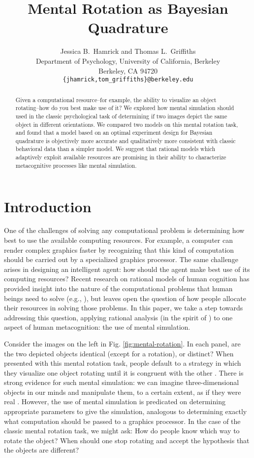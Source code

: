 \documentclass{article} %
\title{Mental Rotation as Bayesian Quadrature}
\author{Jessica B.~Hamrick and Thomas L.~Griffiths\\
  Department of Psychology, University of California, Berkeley\\
  Berkeley, CA 94720\\
  \texttt{\{jhamrick,tom\_griffiths\}@berkeley.edu}}
\begin{document}
\maketitle

\begin{abstract}
  Given a computational resource--for example, the ability to
  visualize an object rotating--how do you best make use of it? We
  explored how mental simulation should used in the classic
  psychological task of determining if two images depict the same
  object in different orientations. We compared two models on this
  mental rotation task, and found that a model based on an optimal
  experiment design for Bayesian quadrature is objectively more
  accurate and qualitatively more consistent with classic behavioral
  data than a simpler model. We suggest that rational models which
  adaptively exploit available resources are promising in their
  ability to characterize metacognitive processes like mental
  simulation.
\end{abstract}

\section{Introduction}

One of the challenges of solving any computational problem is
determining how best to use the available computing resources. For
example, a computer can render complex graphics faster by recognizing
that this kind of computation should be carried out by a specialized
graphics processor. The same challenge arises in designing an
intelligent agent: how should the agent make best use of its computing
resources? Recent research on rational models of human cognition has
provided insight into the nature of the computational problems that
human beings need to solve (e.g., \cite{Chater:1999wp,tenenbaumkgg11}),
but leaves open the question of how people allocate their resources in
solving those problems. In this paper, we take a step towards
addressing this question, applying rational analysis (in the spirit of
\cite{Marr:1983to,anderson90,Shepard:1987tt}) to one aspect of human
metacognition: the use of mental simulation.

Consider the images on the left in Fig.
\ref{fig:mental-rotation}. In each panel, are the two depicted objects
identical (except for a rotation), or distinct? When presented with
this mental rotation task, people default to a strategy in which they
visualize one object rotating until it is congruent with the other
\cite{Shepard1971}. There is strong evidence for such mental
simulation: we can imagine three-dimensional objects in our minds and
manipulate them, to a certain extent, as if they were real
\cite{Kosslyn:2009tj}.  However, the use of mental simulation is
predicated on determining appropriate parameters to give the
simulation, analogous to determining exactly what computation should
be passed to a graphics processor.  In the case of the classic mental
rotation task, we might ask: How do people know which way to rotate
the object?  When should one stop rotating and accept the hypothesis
that the objects are different?
\end{document}
